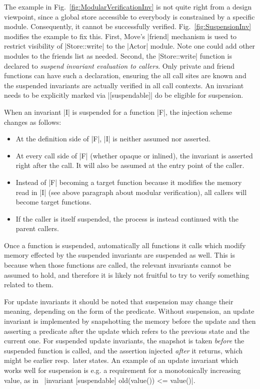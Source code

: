 The example in Fig.~\ref{fig:ModularVerificationInv} is not quite right from a
design viewpoint, since a global store accessible to everybody is constrained by
a specific module. Consequently, it cannot be successfully
verified. Fig.~\ref{fig:SuspensionInv} modifies the example to fix this. First,
Move's |friend| mechanism is used to restrict visibility of |Store::write| to
the |Actor| module. Note one could add other modules to the friends list as
needed.  Second, the |Store::write| function is declared to \emph{suspend
  invariant evaluation to callers}. Only private and friend functions can have
such a declaration, ensuring the all call sites are known and the suspended
invariants are actually verified in all call contexts.  An invariant needs to be
explicitly marked via |[suspendable]| do be eligible for suspension.

When an invariant |I| is suspended for a function |F|, the injection scheme changes
as follows:

\begin{itemize}
\item At the definition side of |F|, |I| is neither assumed nor asserted.
\item At every call side of |F| (whether opaque or inlined), the invariant
  is asserted right after the call. It will also be assumed at the entry point
  of the caller.
\item Instead of |F| becoming a target function because it modifies the memory
  read in |I| (see above paragraph about modular verification), all callers will
  become target functions.
\item If the caller is itself suspended, the process is instead continued with
  the parent callers.
\end{itemize}

Once a function is suspended, automatically all functions it calls which modify
memory effected by the suspended invariants are suspended as well. This is
because when those functions are called, the relevant invariants cannot be
assumed to hold, and therefore it is likely not fruitful to try to verify
something related to them.

For update invariants it should be noted that suspension may change their
meaning, depending on the form of the predicate. Without suspension, an update
invariant is implemented by snapshotting the memory before the update and then
asserting a predicate after the update which refers to the previous state and
the current one. For suspended update invariants, the snapshot is taken
\emph{before} the suspended function is called, and the assertion injected
\emph{after} it returns, which might be earlier resp.~later states. An example
of an update invariant which works well for suspension is e.g. a requirement for
a monotonically increasing value, as in~%
|invariant [suspendable] old(value()) <= value()|.

